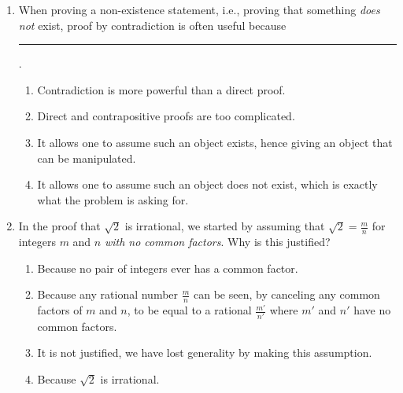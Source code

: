 \pagestyle{empty}


\begin{enumerate}
  \item When proving a non-existence statement, i.e., proving that something \emph{does not} exist, proof by contradiction is often useful because \rule{5cm}{0.15mm}.
  \begin{enumerate}
    \item Contradiction is more powerful than a direct proof.
    \item Direct and contrapositive proofs are too complicated.
    \item It allows one to assume such an object exists, hence giving an object that can be manipulated.
    \item It allows one to assume such an object does not exist, which is exactly what the problem is asking for.
  \end{enumerate}
  
  
% 
% 


  \item In the proof that $\sqrt{2}$ is irrational, we started by assuming that $\sqrt{2}=\frac{m}{n}$ for integers $m$ and $n$ \emph{with no common factors}. Why is this justified?
  \begin{enumerate}
      \item Because no pair of integers ever has a common factor.
      \item Because any rational number $\frac mn$ can be seen, by canceling any common factors of $m$ and $n$, to be equal to a rational $\frac{m'}{n'}$ where $m'$ and $n'$ have no common factors.
      \item It is not justified, we have lost generality by making this assumption.
      \item Because $\sqrt{2}$ is irrational.
  \end{enumerate}
  
\end{enumerate}




